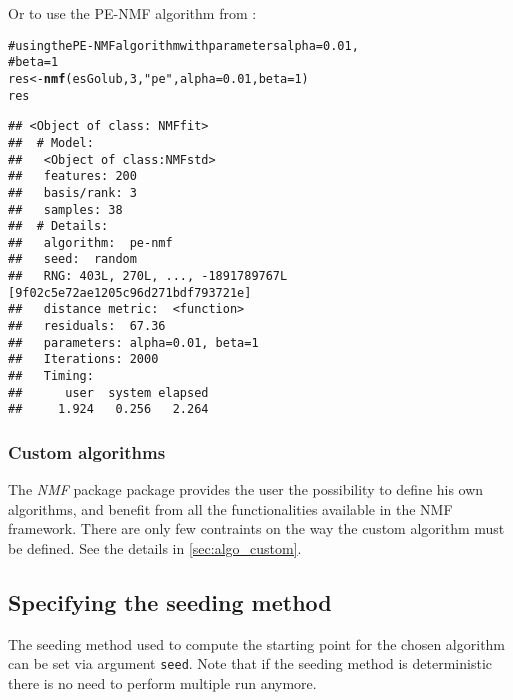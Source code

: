 \documentclass[a4paper]{article}\usepackage{graphicx, color}
\makeatletter
\newcommand{\hlfunctioncall}[1]{\textcolor[rgb]{0.501960784313725,0,0.329411764705882}{\textbf{#1}}}%
\newcommand{\hlstring}[1]{\textcolor[rgb]{0.6,0.6,1}{#1}}%
\newcommand{\hlcomment}[1]{\textcolor[rgb]{0.180392156862745,0.6,0.341176470588235}{#1}}%
\newenvironment{kframe}{%
 \def\at@end@of@kframe{}%
 \ifinner\ifhmode%
  \def\at@end@of@kframe{\end{minipage}}%
  \begin{minipage}{\columnwidth}%
 \fi\fi%
 \def\FrameCommand##1{\hskip\@totalleftmargin \hskip-\fboxsep
 \colorbox{shadecolor}{##1}\hskip-\fboxsep
     \hskip-\linewidth \hskip-\@totalleftmargin \hskip\columnwidth}%
 \MakeFramed {\advance\hsize-\width
   \@totalleftmargin\z@ \linewidth\hsize
   \@setminipage}}%
 {\par\unskip\endMakeFramed%
 \at@end@of@kframe}
\newenvironment{knitrout}{}{} %
\let\code=\texttt
\newcommand{\pkgname}[1]{\textit{#1}\xspace}
\newcommand{\Rpkg}[1]{\pkgname{#1} package\xspace}
\newcommand{\nmfpack}{\Rpkg{NMF}}
\renewcommand{\cite}[1]{\parencite{#1}}
\makeatother
\begin{document}
Or to use the PE-NMF algorithm from \cite{Zhang2008}:
\begin{knitrout}
\color{fgcolor}\begin{kframe}
\begin{alltt}
\hlcomment{# using the PE-NMF algorithm with parameters alpha=0.01,}
\hlcomment{# beta=1}
res <- \hlfunctioncall{nmf}(esGolub, 3, \hlstring{"pe"}, alpha = 0.01, beta = 1)
res
\end{alltt}
\begin{verbatim}
## <Object of class: NMFfit>
##  # Model:
##   <Object of class:NMFstd>
##   features: 200 
##   basis/rank: 3 
##   samples: 38 
##  # Details:
##   algorithm:  pe-nmf 
##   seed:  random 
##   RNG: 403L, 270L, ..., -1891789767L [9f02c5e72ae1205c96d271bdf793721e]
##   distance metric:  <function> 
##   residuals:  67.36 
##   parameters: alpha=0.01, beta=1 
##   Iterations: 2000 
##   Timing:
##      user  system elapsed 
##     1.924   0.256   2.264
\end{verbatim}
\end{kframe}
\end{knitrout}


%
%
%


\subsubsection{Custom algorithms}
The \nmfpack package provides the user the possibility to define his own algorithms, and benefit from all the functionalities available in the NMF framework.
There are only few contraints on the way the custom algorithm must be defined.
See the details in \cref{sec:algo_custom}.

\subsection{Specifying the seeding method}\label{sec:seed}
The seeding method used to compute the starting point for the chosen algorithm can be set via argument \code{seed}. 
Note that if the seeding method is deterministic there is no need to perform multiple run anymore.
\end{document}
